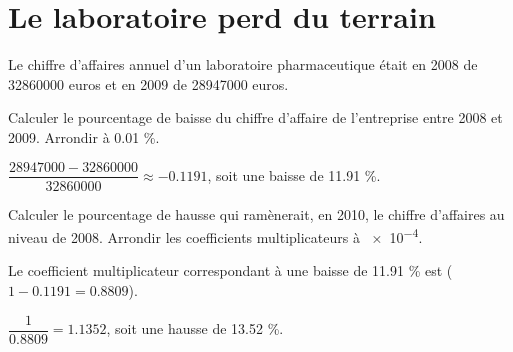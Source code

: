 \documentclass[a4paper,11pt]{exam}
\begin{document}
\section{Le laboratoire perd du terrain}

Le chiffre d'affaires annuel d'un laboratoire pharmaceutique était en 2008 de \num{32860000} euros et en 2009 de \num{28947000} euros.
\begin{questions}
	\question Calculer le pourcentage de baisse du chiffre d'affaire de l'entreprise entre 2008 et 2009. Arrondir à \num{0.01} \%.
	\begin{solution}
		$\dfrac{\num{28947000} - \num{32860000}}{\num{32860000}} \approx \num{-0.1191}$, soit une baisse de \num{11.91} \%.
	\end{solution}
	
	\question Calculer le pourcentage de hausse qui ramènerait, en 2010, le chiffre d'affaires au niveau de 2008. Arrondir les coefficients multiplicateurs à \num{e-4}.
	\begin{solution}
		Le coefficient multiplicateur correspondant à une baisse de \num{11.91} \% est ($1-\num{0.1191} = \num{0.8809}$).
		
		$\dfrac{1}{\num{0.8809}} = \num{1.1352}$, soit une hausse de \num{13.52} \%.
	\end{solution}
\end{questions}


	\label{LastPage}
	
\end{document}
